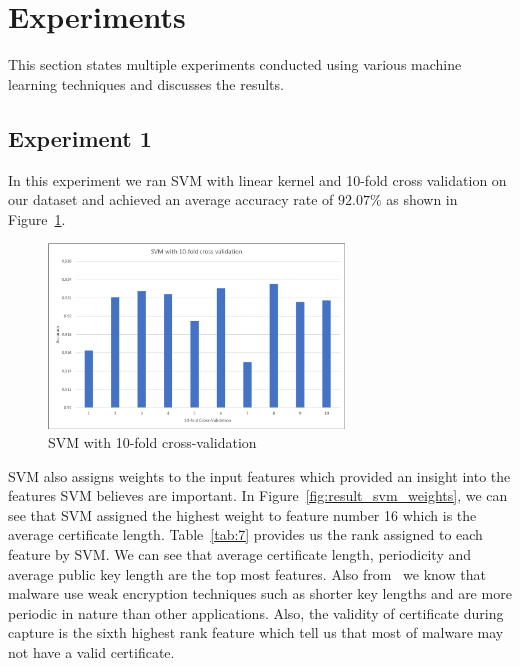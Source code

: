 \clearpage

\section{Experiments}

This section states multiple experiments conducted using various machine learning techniques and discusses the results. 

\subsection{Experiment 1}

In this experiment we ran SVM with linear kernel and 10-fold cross validation on our dataset and achieved an average accuracy rate of $92.07$\% as shown in Figure~\ref{fig:result_svm}.

\begin{figure}[htb]
	\centering
	\includegraphics[width=0.7\textwidth]{images/svm.png}
	\caption{SVM with 10-fold cross-validation} 
	\label{fig:result_svm}
\end{figure}

SVM also assigns weights to the input features which provided an insight into the features SVM believes are important. In Figure~\ref{fig:result_svm_weights}, we can see that SVM assigned the highest weight to feature number 16 which is the average certificate length. Table~\ref{tab:7} provides us the rank assigned to each feature by SVM. We can see that average certificate length, periodicity and average public key length are the top most features. Also from~\cite{AndersonM16} we know that malware use weak encryption techniques such as shorter key lengths and are more periodic in nature than other applications. Also, the validity of certificate during capture is the sixth highest rank feature which tell us that most of malware may not have a valid certificate.

